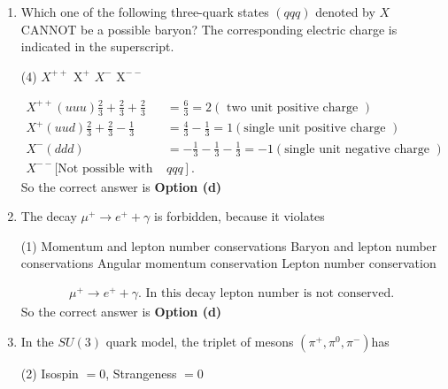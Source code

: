\begin{enumerate}
\begin{tasks}
		\task[\textbf{c.}] Isospin
		\task[\textbf{d.}] Strangeness
	\end{tasks}
	\begin{answer}
		So the correct answer is \textbf{Option (c)}
	\end{answer}
	\item  Which one of the following three-quark states $(q q q)$ denoted by $X$ CANNOT be a possible baryon? The corresponding electric charge is indicated in the superscript.
	{}
	\begin{tasks}(4)
		\task[\textbf{a.}]$X^{++}$
		\task[\textbf{b.}]$\mathrm{X}^{+}$
		\task[\textbf{c.}]$X^{-}$
		\task[\textbf{d.}] $\mathrm{X}^{--}$ 
	\end{tasks}
	\begin{answer}
		\begin{align*}
		X^{++}(u u u) \frac{2}{3}+\frac{2}{3}+\frac{2}{3}&=\frac{6}{3}=2(\text{ two unit positive charge })\\
		X^{+}(u u d) \frac{2}{3}+\frac{2}{3}-\frac{1}{3}&=\frac{4}{3}-\frac{1}{3}=1( \text{single unit positive charge })\\
		X^{-}(d d d)&=-\frac{1}{3}-\frac{1}{3}-\frac{1}{3}=-1 (\text{single unit negative charge })\\
		X^{--}\text{[Not possible with }&\left.q q q\right]. 
		\end{align*}
		So the correct answer is \textbf{Option (d)}
	\end{answer}
	\item  The decay $\mu^{+} \rightarrow e^{+}+\gamma$ is forbidden, because it violates
	{}
	\begin{tasks}(1)
		\task[\textbf{a.}] Momentum and lepton number conservations
		\task[\textbf{b.}]Baryon and lepton number conservations
		\task[\textbf{c.}]Angular momentum conservation
		\task[\textbf{d.}]  Lepton number conservation
	\end{tasks}
	\begin{answer}
		\begin{align*}
		\mu^{+} \rightarrow e^{+}+\gamma \text {. In this decay lepton number is not conserved. }
		\end{align*}
		So the correct answer is \textbf{Option (d)}
	\end{answer}
	\item  In the $S U(3)$ quark model, the triplet of mesons $\left(\pi^{+}, \pi^0, \pi^{-}\right)$has
	{}
	\begin{tasks}(2)
		\task[\textbf{a.}]Isospin $=0$, Strangeness $=0$

\end{tasks}
\end{enumerate}
